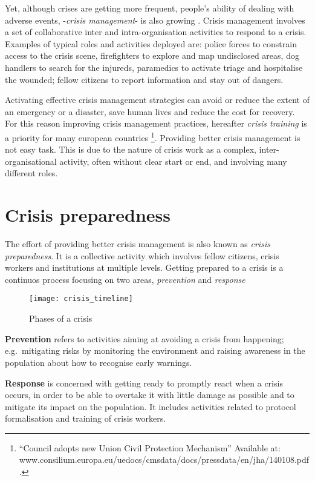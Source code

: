 Yet, although crises are getting more frequent, people's ability of dealing with adverse events, -\emph{crisis management}- is also growing \autocite{Boin:2009bv}. Crisis management involves a set of collaborative inter and intra-organisation activities to respond to a crisis. Examples of typical roles and activities deployed are: police forces to constrain access to the crisis scene, firefighters to explore and map undisclosed areas, dog handlers to search for the injureds, paramedics to activate triage and hospitalise the wounded; fellow citizens to report information and stay out of dangers.

Activating effective crisis management strategies can avoid or reduce the extent of an emergency or a disaster, save human lives and reduce the cost for recovery. For this reason improving crisis management practices, hereafter \emph{crisis training} is a priority for many european countries \footnote{``Council adopts new Union Civil Protection Mechanism'' Available at: www.consilium.europa.eu/uedocs/cmsdata/docs/pressdata/en/jha/140108.pdf.}. Providing better crisis management is not easy task. This is due to the nature of crisis work as a complex, inter-organisational activity, often without clear start or end, and involving many different roles.

\section{Crisis preparedness}\label{crisis-preparedness}

The effort of providing better crisis management is also known as \emph{crisis preparedness}. It is a collective activity which involves fellow citizens, crisis workers and institutions at multiple levels. Getting prepared to a crisis is a continuos process focusing on two areas, \emph{prevention} and \emph{response} \autocite{Deverell:2009fk}

\begin{figure}
	[h!] \centering 
	\texttt{[image: crisis\_timeline]} \caption{Phases of a crisis} \label{fig:phases} 
\end{figure}

\textbf{Prevention} refers to activities aiming at avoiding a crisis from happening; e.g.~mitigating risks by monitoring the environment and raising awareness in the population about how to recognise early warnings.

\textbf{Response} is concerned with getting ready to promptly react when a crisis occurs, in order to be able to overtake it with little damage as possible and to mitigate its impact on the population. It includes activities related to protocol formalisation and training of crisis workers.

